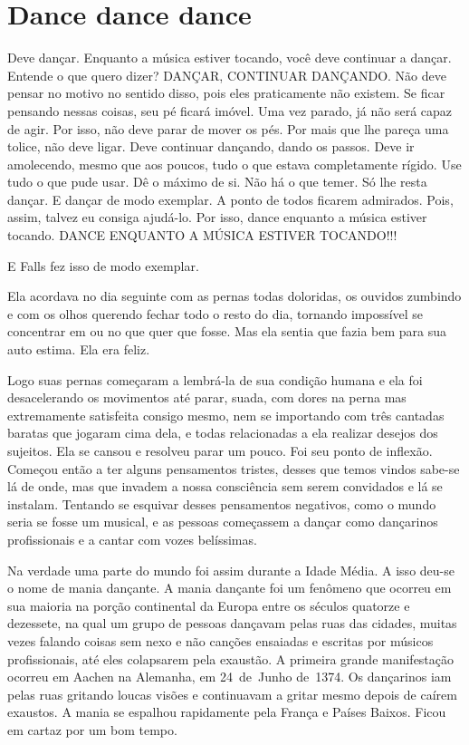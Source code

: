 \chapter{Dance dance dance}

\vspace{3em}

Deve dançar. Enquanto a música estiver tocando, você deve continuar a dançar. Entende o que quero dizer? DANÇAR, CONTINUAR DANÇANDO. Não deve pensar no motivo  no sentido disso, pois eles praticamente não existem. Se ficar pensando nessas coisas, seu pé ficará imóvel. Uma vez parado, já não será capaz de agir. Por isso, não deve parar de mover os pés. Por mais que lhe pareça uma tolice, não deve ligar. Deve continuar dançando, dando os passos. Deve ir amolecendo, mesmo que aos poucos, tudo o que estava completamente rígido. Use tudo o que pude usar. Dê o máximo de si. Não há o que temer. Só lhe resta dançar. E dançar de modo exemplar. A ponto de todos ficarem admirados. Pois, assim, talvez eu consiga ajudá-lo. Por isso, dance enquanto a música estiver tocando. DANCE ENQUANTO A MÚSICA ESTIVER TOCANDO!!!

E Falls fez isso de modo exemplar.

Ela acordava no dia seguinte com as pernas todas doloridas, os ouvidos zumbindo e com os olhos querendo fechar todo o resto do dia, tornando impossível se concentrar em  ou no que quer que fosse. Mas ela sentia que fazia bem para sua auto estima. Ela era feliz.

Logo suas pernas começaram a lembrá-la de sua condição humana e ela foi desacelerando os movimentos até parar, suada, com dores na perna\mudanca{,} mas extremamente satisfeita consigo mesmo, nem se importando com três cantadas baratas que jogaram  cima dela, e todas relacionadas a ela realizar desejos dos sujeitos. Ela se cansou e resolveu parar um pouco. Foi seu ponto de inflexão. Começou então a ter alguns pensamentos tristes, desses que temos vindos sabe-se lá de onde, mas que invadem a nossa consciência sem serem convidados e lá se instalam. Tentando se esquivar desses pensamentos negativos,  como o mundo seria se fosse um musical, e as pessoas começassem a dançar como dançarinos profissionais e a cantar com vozes belíssimas.

Na verdade\mudanca{,} uma parte do mundo foi assim durante a Idade Média. A isso deu-se o nome de mania dançante. A mania dançante foi um fenômeno que ocorreu em sua maioria na porção continental da Europa entre os séculos quatorze e dezessete, na qual um grupo de pessoas dançavam pelas ruas das cidades, muitas vezes falando coisas sem nexo e não canções ensaiadas e escritas por músicos profissionais, até eles colapsarem pela exaustão. A primeira grande manifestação ocorreu em Aachen na Alemanha, em 24~de~Junho de~1374. Os dançarinos iam pelas ruas gritando loucas visões e continuavam a gritar\mudanca{,} mesmo depois de caírem exaustos. A mania se espalhou rapidamente pela França e Países Baixos. Ficou em cartaz por um bom tempo.

